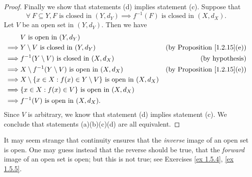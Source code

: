 \begin{proof}
    Finally we show that statements (d) implies statement (c).
    Suppose that
    \[
        \forall\ F \subseteq Y, F \text{ is closed in } (Y, d_Y) \implies f^{-1}(F) \text{ is closed in } (X, d_X).
    \]
    Let \(V\) be an open set in \((Y, d_Y)\).
    Then we have
    \begin{align*}
                 & V \text{ is open in } (Y, d_Y)                                                                                          \\
        \implies & Y \setminus V \text{ is closed in } (Y, d_Y)                                  & \text{(by Proposition \ref{1.2.15}(e))} \\
        \implies & f^{-1}(Y \setminus V) \text{ is closed in } (X, d_X)                          & \text{(by hypothesis)}                  \\
        \implies & X \setminus f^{-1}(Y \setminus V) \text{ is open in } (X, d_X)                & \text{(by Proposition \ref{1.2.15}(e))} \\
        \implies & X \setminus \{x \in X : f(x) \in Y \setminus V\} \text{ is open in } (X, d_X)                                           \\
        \implies & \{x \in X : f(x) \in V\} \text{ is open in } (X, d_X)                                                                   \\
        \implies & f^{-1}(V) \text{ is open in } (X, d_X).
    \end{align*}
    Since \(V\) is arbitrary, we know that statement (d) implies statement (c).
    We conclude that statements (a)(b)(c)(d) are all equivalent.
\end{proof}

\begin{remark}\label{2.1.6}
    It may seem strange that continuity ensures that the \emph{inverse} image of an open set is open.
    One may guess instead that the reverse should be true, that the \emph{forward} image of an open set is open;
    but this is not true;
    see Exercises \ref{ex 1.5.4}, \ref{ex 1.5.5}.
\end{remark}